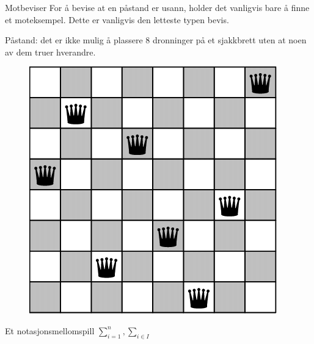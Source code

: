 \begin{frame}{Motbeviser}
    For å bevise at en påstand er usann, holder det vanligvis bare å finne et moteksempel. Dette er vanligvis den letteste typen bevis.
    
    \begin{block}{Påstand: det er ikke mulig å plassere 8 dronninger på et sjakkbrett uten at noen av dem truer hverandre.}
    \begin{figure}
        \centering
        \includegraphics[scale=0.20]{8 queens.png}
        \label{fig:my_label}
    \end{figure}
    
    \end{block}
\end{frame}

\begin{frame}{Et notasjonsmellomspill}
    $\sum_{i=1}^n, \sum_{i \in I}$
\end{frame}

